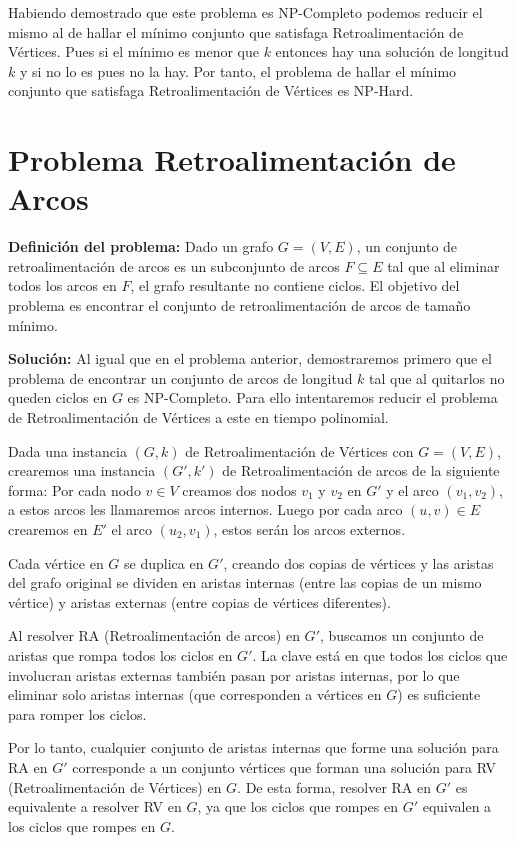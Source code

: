 \documentclass[9pt]{article}
\begin{document}
Habiendo demostrado que este problema es NP-Completo podemos reducir el mismo al de hallar el mínimo conjunto que satisfaga Retroalimentación de Vértices. Pues si el mínimo es menor que $k$ entonces hay una solución de longitud $k$ y si no lo es pues no la hay. Por tanto, el problema de hallar el mínimo conjunto que satisfaga Retroalimentación de Vértices es NP-Hard.


\section*{Problema Retroalimentación de Arcos}

\textbf{Definición del problema:} Dado un grafo $G = (V, E)$, un conjunto de retroalimentación de arcos es un subconjunto de arcos $F \subseteq E$ tal que al eliminar todos los arcos en $F$, el grafo resultante no contiene ciclos. El objetivo del problema es encontrar el conjunto de retroalimentación de arcos de tamaño mínimo.

\textbf{Solución:} Al igual que en el problema anterior, demostraremos primero que el problema de encontrar un conjunto de arcos de longitud $k$ tal que al quitarlos no queden ciclos en $G$ es NP-Completo. Para ello intentaremos reducir el problema de Retroalimentación de Vértices a este en tiempo polinomial.

Dada una instancia $(G, k)$ de Retroalimentación de Vértices con $G = (V, E)$, crearemos una instancia $(G', k')$ de Retroalimentación de arcos de la siguiente forma:
Por cada nodo $v \in V$ creamos dos nodos $v_1$ y $v_2$ en $G'$ y el arco $(v_1, v_2)$, a estos arcos les llamaremos arcos internos. Luego por cada arco $(u, v) \in E$ crearemos en $E'$ el arco $(u_2, v_1)$, estos serán los arcos externos.

Cada vértice en $G$ se duplica en $G'$, creando dos copias de vértices y las aristas del grafo original se dividen en aristas internas (entre las copias de un mismo vértice) y aristas externas (entre copias de vértices diferentes).

Al resolver RA (Retroalimentación de arcos) en $G'$, buscamos un conjunto de aristas que rompa todos los ciclos en $G'$. La clave está en que todos los ciclos que involucran aristas externas también pasan por aristas internas, por lo que eliminar solo aristas internas (que corresponden a vértices en $G$) es suficiente para romper los ciclos.

Por lo tanto, cualquier conjunto de aristas internas que forme una solución para RA en $G'$ corresponde a un conjunto vértices que forman una solución para RV (Retroalimentación de Vértices) en $G$. De esta forma, resolver RA en $G'$ es equivalente a resolver RV en $G$, ya que los ciclos que rompes en $G'$ equivalen a los ciclos que rompes en $G$.
\end{document}
